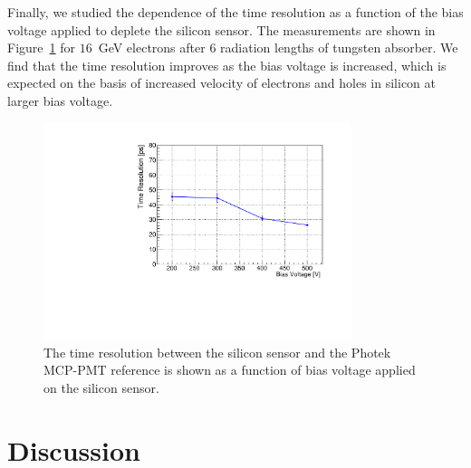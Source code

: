\documentclass[12pt]{article}
\begin{document}
Finally, we studied the dependence of the time resolution as a function of the
bias voltage applied to deplete the silicon sensor. The measurements are shown
in Figure~\ref{fig:SigmaT_vs_DV_lin30Stamp} for $16$~GeV electrons after
6 radiation lengths of tungsten absorber. We find that the time resolution
improves as the bias voltage is increased, which is expected on the basis of 
increased velocity of electrons and holes in silicon at larger bias voltage. 

\begin{figure}[htbp] 
\centering
\includegraphics[width=0.8\textwidth]{plots/SigmaT_vs_DV_lin30Stamp.pdf} 
\caption{The time resolution between the silicon sensor and the Photek MCP-PMT 
reference is shown as a function of bias voltage applied on the silicon sensor. } 
\label{fig:SigmaT_vs_DV_lin30Stamp} 
\end{figure} 

\section{Discussion} 
\label{sec:discussion} 
\end{document}
